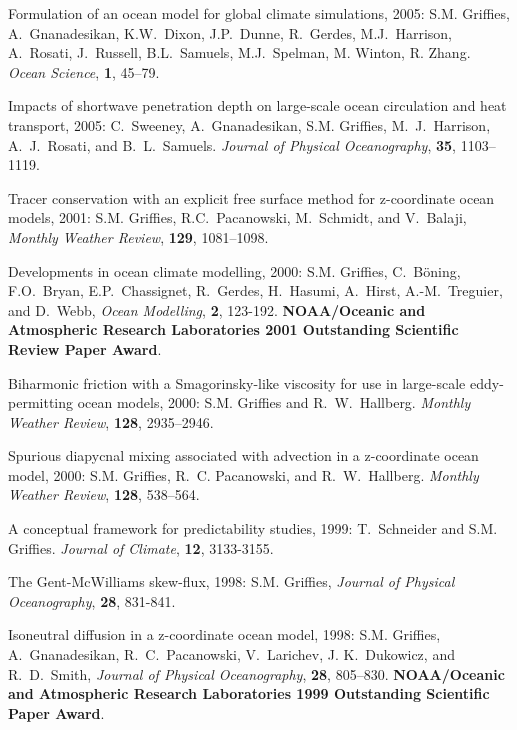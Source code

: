 \begin{etaremune}
\item Formulation of an ocean model for global climate simulations,
2005: S.M. Grif\/f\/ies, A.\ Gnanadesikan, K.W.\ Dixon, J.P.\
Dunne, R.\ Gerdes, M.J.\ Harrison, A.\ Rosati, J.\ Russell, B.L.\
Samuels, M.J.\ Spelman, M. Winton, R. Zhang. {\em Ocean Science}, {\bf
1}, 45--79.

\item Impacts of shortwave penetration depth on large-scale ocean
circulation and heat transport, 2005: C.\ Sweeney, A.\ Gnanadesikan,
S.M. Grif\/f\/ies, M.\ J.\ Harrison, A.\ J.\ Rosati, and B.\
L.\ Samuels.  {\em Journal of Physical Oceanography}, {\bf 35},
1103--1119.

\item Tracer conservation with an explicit free surface method for
  z-coordinate ocean models, 2001: 
  S.M. Grif\/f\/ies, R.C.\
  Pacanowski, M.\ Schmidt, and V.\ Balaji, {\em Monthly Weather
    Review}, {\bf 129}, 1081--1098.

\item Developments in ocean climate modelling, 2000:  S.M. Grif\/f\/ies, C.\ B\"oning, F.O.\ Bryan, E.P.\ Chassignet, R.\
  Gerdes, H.\ Hasumi, A.\ Hirst, A.-M.\ Treguier, and D.\ Webb, {\em
    Ocean Modelling}, {\bf 2}, 123-192.  {\bf 
    NOAA/Oceanic and Atmospheric Research Laboratories 2001
    Outstanding Scientific Review Paper Award}.

\item Biharmonic friction with a  Smagorinsky-like viscosity for use in large-scale eddy-permitting ocean models, 2000:
S.M. Grif\/f\/ies and R.\ W.\ Hallberg.  {\em Monthly Weather
Review}, {\bf 128}, 2935--2946.

\item Spurious diapycnal mixing associated with advection in a z-coordinate ocean model, 2000: S.M. Grif\/f\/ies, R.\ C. Pacanowski, and R.\ W.\ Hallberg. {\em Monthly Weather Review}, {\bf
128}, 538--564.

\item A conceptual framework for predictability studies, 1999: T.\ 
Schneider and S.M. Grif\/f\/ies.  {\em Journal of Climate},
{\bf 12}, 3133-3155.
  
\item The Gent-McWilliams skew-flux, 1998:
S.M. Grif\/f\/ies, {\em Journal of Physical Oceanography}, {\bf 28}, 831-841.
  
\item Isoneutral diffusion in a z-coordinate ocean model, 1998: S.M. Grif\/f\/ies, A.\ Gnanadesikan, R.\ C.\ Pacanowski, V.\
  Larichev, J. K.\ Dukowicz, and R.\ D.\ Smith, {\em Journal of
    Physical Oceanography}, {\bf 28}, 805--830.  {\bf
    NOAA/Oceanic and Atmospheric Research Laboratories 1999
    Outstanding Scientific Paper Award}.
  

\end{etaremune}
